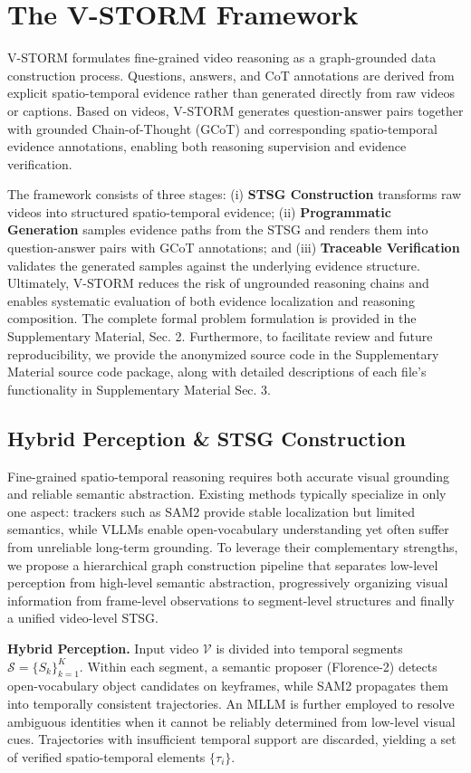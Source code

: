 \documentclass[letterpaper]{article} %
\begin{document}
\section{The V-STORM Framework}
V-STORM formulates fine-grained video reasoning as a graph-grounded data construction process. Questions, answers, and CoT annotations are derived from explicit spatio-temporal evidence rather than generated directly from raw videos or captions.
Based on videos, V-STORM generates question-answer pairs together with grounded Chain-of-Thought (GCoT) and corresponding spatio-temporal evidence annotations, enabling both reasoning supervision and evidence verification.

The framework consists of three stages: (i) \textbf{STSG Construction} transforms raw videos into structured spatio-temporal evidence; (ii) \textbf{Programmatic Generation} samples evidence paths from the STSG and renders them into question-answer pairs with GCoT annotations; and (iii) \textbf{Traceable Verification} validates the generated samples against the underlying evidence structure. Ultimately, V-STORM reduces the risk of ungrounded reasoning chains and enables systematic evaluation of both evidence localization and reasoning composition. The complete formal problem formulation is provided in the Supplementary Material, Sec. 2. Furthermore, to facilitate review and future reproducibility, we provide the anonymized source code in the Supplementary Material source code package, along with detailed descriptions of each file's functionality in Supplementary Material Sec. 3.

\subsection{Hybrid Perception \& STSG Construction}

Fine-grained spatio-temporal reasoning requires both accurate visual grounding and reliable semantic abstraction. Existing methods typically specialize in only one aspect: trackers such as SAM2 provide stable localization but limited semantics, while VLLMs enable open-vocabulary understanding yet often suffer from unreliable long-term grounding. To leverage their complementary strengths, we propose a hierarchical graph construction pipeline that separates low-level perception from high-level semantic abstraction, progressively organizing visual information from frame-level observations to segment-level structures and finally a unified video-level STSG.

\noindent\textbf{Hybrid Perception.}
Input video $\mathcal{V}$ is divided into temporal segments $\mathcal{S}=\{S_k\}_{k=1}^{K}$.
Within each segment, a semantic proposer (Florence-2) detects open-vocabulary object candidates on keyframes, while SAM2 propagates them into temporally consistent trajectories.
An MLLM is further employed to resolve ambiguous identities when it cannot be reliably determined from low-level visual cues.
Trajectories with insufficient temporal support are discarded, yielding a set of verified spatio-temporal elements $\{\tau_i\}$.
\end{document}
